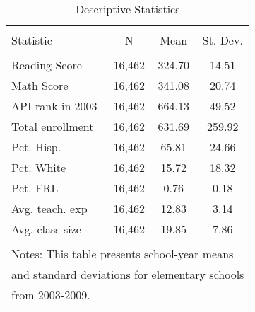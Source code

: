 
\begin{table}[!htbp] \centering 
  \caption{Descriptive Statistics} 
  \label{tab:descriptives} 
\begin{tabular}{@{\extracolsep{5pt}}lccc} 
\\[-1.8ex]\hline 
\hline \\[-1.8ex] 
Statistic & \multicolumn{1}{c}{N} & \multicolumn{1}{c}{Mean} & \multicolumn{1}{c}{St. Dev.} \\ 
\hline \\[-1.8ex] 
Reading Score & 16,462 & 324.70 & 14.51 \\ 
Math Score & 16,462 & 341.08 & 20.74 \\ 
API rank in 2003 & 16,462 & 664.13 & 49.52 \\ 
Total enrollment & 16,462 & 631.69 & 259.92 \\ 
Pct. Hisp. & 16,462 & 65.81 & 24.66 \\ 
Pct. White & 16,462 & 15.72 & 18.32 \\ 
Pct. FRL & 16,462 & 0.76 & 0.18 \\ 
Avg. teach. exp & 16,462 & 12.83 & 3.14 \\ 
Avg. class size & 16,462 & 19.85 & 7.86 \\ 
\hline \\[-1.8ex] 
\multicolumn{4}{l}{Notes: This table presents school-year means} \\ 
\multicolumn{4}{l}{and standard deviations for elementary schools} \\ 
\multicolumn{4}{l}{ from 2003-2009.} \\ 
\end{tabular} 
\end{table} 
